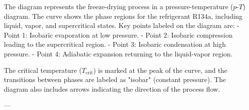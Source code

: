 The diagram represents the freeze-drying process in a pressure-temperature (\(p\)-\(T\)) diagram. The curve shows the phase regions for the refrigerant R134a, including liquid, vapor, and supercritical states. Key points labeled on the diagram are:  
- Point 1: Isobaric evaporation at low pressure.  
- Point 2: Isobaric compression leading to the supercritical region.  
- Point 3: Isobaric condensation at high pressure.  
- Point 4: Adiabatic expansion returning to the liquid-vapor region.  

The critical temperature (\(T_{\text{crit}}\)) is marked at the peak of the curve, and the transitions between phases are labeled as "isobar" (constant pressure). The diagram also includes arrows indicating the direction of the process flow.

---